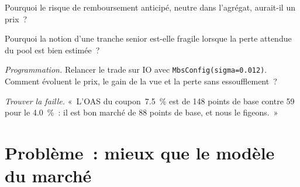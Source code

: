 \begin{exercise}[$\star\star$]\label{exo:s2:mortgage-and-structured-credit-strategies:5}
Pourquoi le risque de remboursement anticipé, neutre dans l'agrégat, aurait-il un prix~?
\end{exercise}

\begin{exercise}[$\star\star$]\label{exo:s2:mortgage-and-structured-credit-strategies:6}
Pourquoi la notion d'une tranche senior est-elle fragile lorsque la perte attendue du pool est bien estimée~?
\end{exercise}

\begin{exercise}[$\star\star\star$]\label{exo:s2:mortgage-and-structured-credit-strategies:7}
\emph{Programmation.} Relancer le trade sur IO avec \texttt{MbsConfig(sigma=0.012)}. Comment évoluent le prix, le gain de la vue et la perte sans essoufflement~?
\end{exercise}

\begin{exercise}[$\star\star\star$]\label{exo:s2:mortgage-and-structured-credit-strategies:8}
\emph{Trouver la faille.} «~L'OAS du coupon~7.5~\% est de 148 points de base contre 59 pour le 4.0~\%~: il est bon marché de 88 points de base, et nous le figeons.~»
\end{exercise}

\section{Problème~: mieux que le modèle du marché}

